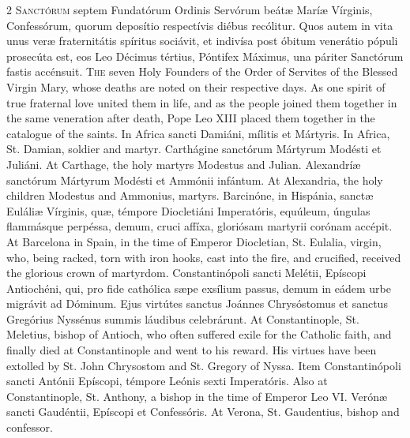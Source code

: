 \begin{paracol}{2}
\lettrine[lines=2]{S}{anctórum} septem Fundatórum Ordinis Servórum beátæ 
 Maríæ Vírginis, Confessórum, quorum deposítio respectívis diébus recólitur. 
 Quos autem in vita unus veræ fraternitátis spíritus sociávit, et indivísa 
 post óbitum venerátio pópuli prosecúta est, eos Leo Décimus tértius, 
 Póntifex Máximus, una páriter Sanctórum fastis accénsuit.
\switchcolumn
{}
\lettrine[lines=2]{T}{he} seven Holy Founders of the Order of Servites of the Blessed Virgin Mary, 
 whose deaths are noted on their respective days. As one spirit of true 
 fraternal love united them in life, and as the people joined them together 
 in the same veneration after death, Pope Leo XIII placed them together in 
 the catalogue of the saints.
\switchcolumn*
{}
In Africa sancti Damiáni, mílitis et Mártyris.
\switchcolumn
{}
In Africa, St. Damian, soldier and martyr.
\switchcolumn*
{}
Carthágine sanctórum Mártyrum Modésti et Juliáni.
\switchcolumn
{}
At Carthage, the holy martyrs Modestus and Julian.
\switchcolumn*
{}
Alexandríæ sanctórum Mártyrum Modésti et 
 Ammónii infántum.
\switchcolumn
{}
At Alexandria, the holy children Modestus and Ammonius, martyrs.
\switchcolumn*
{}
Barcinóne, in Hispánia, sanctæ Euláliæ Vírginis, 
 quæ, témpore Diocletiáni Imperatóris, equúleum, úngulas flammásque perpéssa, 
 demum, cruci affíxa, gloriósam martyrii corónam accépit.
\switchcolumn
{}
At Barcelona in Spain, in the time of Emperor Diocletian, St. Eulalia, 
 virgin, who, being racked, torn with iron hooks, cast into the fire, and 
 crucified, received the glorious crown of martyrdom.
\switchcolumn*
{}
Constantinópoli sancti Melétii, Epíscopi Antiochéni, qui, pro fide cathólica 
 sæpe exsílium passus, demum in eádem urbe 
 migrávit ad Dóminum. Ejus virtútes sanctus Joánnes Chrysóstomus et 
 sanctus Gregórius Nyssénus summis láudibus celebrárunt.
\switchcolumn
{}
At Constantinople, St. Meletius, bishop of Antioch, who often suffered exile 
 for the Catholic faith, and finally died at Constantinople and went to his 
 reward. His virtues have been extolled by St. John Chrysostom and St. 
 Gregory of Nyssa.
\switchcolumn*
{}
Item Constantinópoli sancti Antónii Epíscopi, témpore Leónis sexti 
 Imperatóris.
\switchcolumn
{}
Also at Constantinople, St. Anthony, a bishop in the time of Emperor Leo VI.
\switchcolumn*
{}
Verónæ sancti Gaudéntii, Epíscopi et 
 Confessóris.
\switchcolumn
{}
At Verona, St. Gaudentius, bishop and confessor.
\switchcolumn*
{}
\end{paracol}


